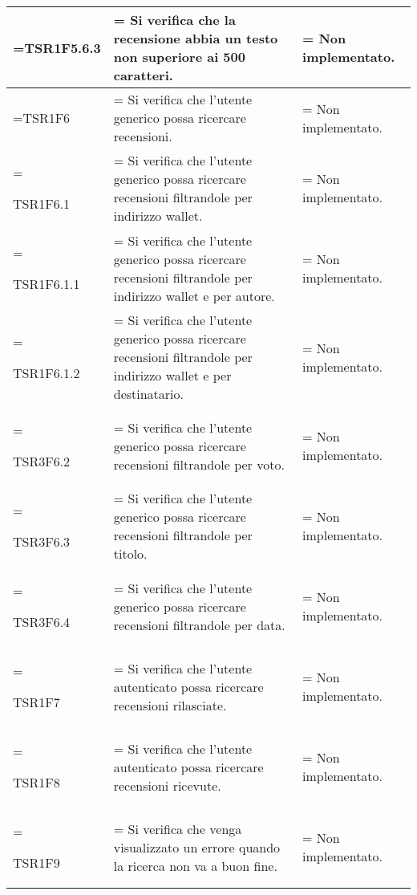 \begin{xltabular}{\textwidth} {
            >{\hsize\linewidth=\hsize}X
            >{\hsize\linewidth=\hsize}X
            >{\hsize\linewidth=\hsize}X
        }
        TSR1F5.6.3&
        Si verifica che la recensione abbia un testo non superiore ai 500 caratteri.&
        Non implementato.
        \\ \hline

        TSR1F6&
        Si verifica che l'utente generico possa ricercare recensioni.&
        Non implementato.
        \\ \hline

        TSR1F6.1&
        Si verifica che l'utente generico possa ricercare recensioni filtrandole per indirizzo wallet.&
        Non implementato.
        \\ \hline
        
        TSR1F6.1.1&
        Si verifica che l'utente generico possa ricercare recensioni filtrandole per indirizzo wallet e per autore.&
        Non implementato.
        \\ \hline
        
        TSR1F6.1.2&
        Si verifica che l'utente generico possa ricercare recensioni filtrandole per indirizzo wallet e per destinatario.&
        Non implementato.
        \\ \hline

        TSR3F6.2&
        Si verifica che l'utente generico possa ricercare recensioni filtrandole per voto.&
        Non implementato.
        \\ \hline
        
        TSR3F6.3&
        Si verifica che l'utente generico possa ricercare recensioni filtrandole per titolo.&
        Non implementato.
        \\ \hline

        TSR3F6.4&
        Si verifica che l'utente generico possa ricercare recensioni filtrandole per data.&
        Non implementato.
        \\ \hline

        TSR1F7&
        Si verifica che l'utente autenticato possa ricercare recensioni rilasciate. &
        Non implementato.
        \\ \hline

        TSR1F8&
        Si verifica che l'utente autenticato possa ricercare recensioni ricevute. &
        Non implementato.
        \\ \hline
        
        TSR1F9&
        Si verifica che venga visualizzato un errore quando la ricerca non va a buon fine. &
        Non implementato.
        \\ \hline


\end{xltabular}
